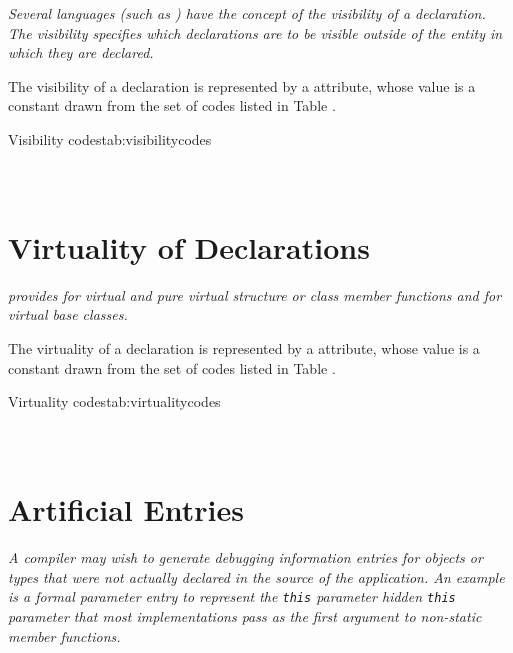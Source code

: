 \textit{Several languages (such as ) 
have the concept of the visibility of a declaration. The
visibility specifies which declarations are to be 
visible outside of the entity in which they are
declared.}

The 
\hypertarget{chap:DWATvisibilityvisibilityofdeclaration}{}
visibility of a declaration is represented 
by a \DWATvisibility{}
attribute, whose value is a
constant drawn from the set of codes listed in 
Table .

\begin{simplenametable}[1.5in]{Visibility codes}{tab:visibilitycodes}
\DWVISlocalTARG{}          \\
\DWVISexportedTARG{}    \\
\DWVISqualifiedTARG{}  \\
\end{simplenametable}

\section{Virtuality of Declarations}
\label{chap:virtualityofdeclarations}
\textit{ provides for virtual and pure virtual structure or class
member functions and for virtual base classes.}

The 
\hypertarget{chap:DWATvirtualityvirtualityindication}{}
virtuality of a declaration is represented by a
\DWATvirtuality{}
attribute, whose value is a constant drawn
from the set of codes listed in 
Table .

\begin{simplenametable}[2.5in]{Virtuality codes}{tab:virtualitycodes}
\DWVIRTUALITYnoneTARG{}                      \\
\DWVIRTUALITYvirtualTARG{}                \\
\DWVIRTUALITYpurevirtualTARG{}    \\
\end{simplenametable}

\section{Artificial Entries}
\label{chap:artificialentries}
\textit{A compiler may wish to generate debugging information entries
for objects or types that were not actually declared in the
source of the application. An example is a formal parameter
entry to represent the 
\texttt{this} parameter
hidden \texttt{this} parameter that most 
implementations pass as the first argument to non-static member
functions.}  

